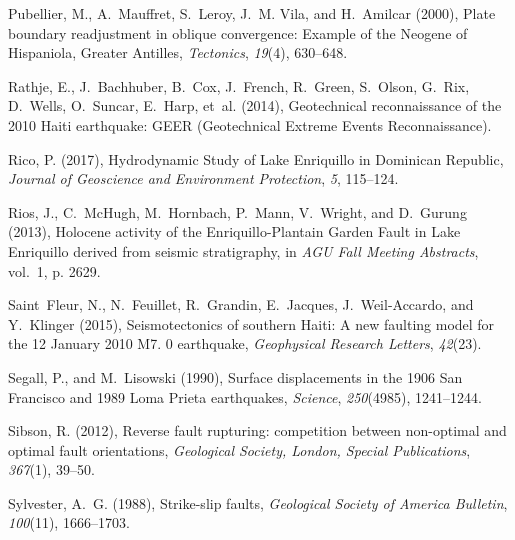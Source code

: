 \documentclass[linenumbers,draft]{agujournal}
\begin{document}
\begin{thebibliography}{62}
Pubellier, M., A.~Mauffret, S.~Leroy, J.~M. Vila, and H.~Amilcar (2000), Plate
  boundary readjustment in oblique convergence: {Example of the Neogene of
  Hispaniola, Greater Antilles}, \textit{Tectonics}, \textit{19}(4), 630--648.

Rathje, E., J.~Bachhuber, B.~Cox, J.~French, R.~Green, S.~Olson, G.~Rix,
  D.~Wells, O.~Suncar, E.~Harp, et~al. (2014), {Geotechnical reconnaissance of
  the 2010 Haiti earthquake: GEER (Geotechnical Extreme Events
  Reconnaissance)}.

Rico, P. (2017), {Hydrodynamic Study of Lake Enriquillo in Dominican Republic},
  \textit{Journal of Geoscience and Environment Protection}, \textit{5},
  115--124.

Rios, J., C.~McHugh, M.~Hornbach, P.~Mann, V.~Wright, and D.~Gurung (2013),
  Holocene activity of the {Enriquillo-Plantain Garden Fault in Lake
  Enriquillo} derived from seismic stratigraphy, in \textit{AGU Fall Meeting
  Abstracts}, vol.~1, p. 2629.

Saint~Fleur, N., N.~Feuillet, R.~Grandin, E.~Jacques, J.~Weil-Accardo, and
  Y.~Klinger (2015), {Seismotectonics of southern Haiti: A new faulting model
  for the 12 January 2010 M7. 0 earthquake}, \textit{Geophysical Research
  Letters}, \textit{42}(23).

Segall, P., and M.~Lisowski (1990), {Surface displacements in the 1906 San
  Francisco and 1989 Loma Prieta earthquakes}, \textit{Science},
  \textit{250}(4985), 1241--1244.

Sibson, R. (2012), Reverse fault rupturing: competition between non-optimal and
  optimal fault orientations, \textit{Geological Society, London, Special
  Publications}, \textit{367}(1), 39--50.

Sylvester, A.~G. (1988), Strike-slip faults, \textit{Geological Society of
  America Bulletin}, \textit{100}(11), 1666--1703.


\end{thebibliography}
\end{document}
